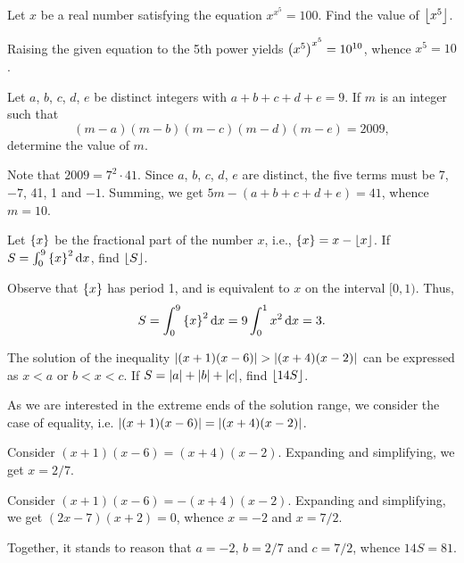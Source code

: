 \begin{question}[10]\label{A::2024-O-1-11}
    Let $x$ be a real number satisfying the equation $x^{x^5} = 100$. Find the value of $\left\lfloor x^5 \right\rfloor$.
\end{question}
\begin{solution*}
    Raising the given equation to the 5th power yields $\left( x^5 \right)^{x^5} = 10^{10}$, whence $x^5 = 10$.
\end{solution*}

\begin{question}[10]\label{A::2024-O-1-12}
    Let $a$, $b$, $c$, $d$, $e$ be distinct integers with $a + b + c + d + e = 9$. If $m$ is an integer such that \[(m-a)(m-b)(m-c)(m-d)(m-e) = 2009,\] determine the value of $m$.
\end{question}
\begin{solution*}
    Note that $2009 = 7^2 \cdot 41$. Since $a$, $b$, $c$, $d$, $e$ are distinct, the five terms must be 7, $-7$, 41, 1 and $-1$. Summing, we get $5m - (a + b + c + d + e) = 41$, whence $m = 10$.
\end{solution*}

\begin{question}[3]\label{A::2024-O-1-13}
    Let $\left\lbrace x \right\rbrace$ be the fractional part of the number $x$, i.e., $\left\lbrace x \right\rbrace = x - \left\lfloor x \right\rfloor$. If $S = \int_0^9 \left\lbrace x \right\rbrace^2 \mathop{\mathrm{d}x}$, find $\left\lfloor S \right\rfloor$.
\end{question}
\begin{solution*}
    Observe that $\left\lbrace x \right\rbrace$ has period 1, and is equivalent to $x$ on the interval $[0, 1)$. Thus, \[S = \int_0^9 \left\lbrace x \right\rbrace^2 \mathop{\mathrm{d}x} = 9 \int_0^1 x^2 \mathop{\mathrm{d}x} = 3.\]
\end{solution*}

\begin{question}[81]\label{A::2024-O-1-14}
    The solution of the inequality $\left\lvert (x+1)(x-6) \right\rvert > \left\lvert (x+4)(x-2) \right\rvert$ can be expressed as $x < a$ or $b < x < c$. If $S = \left\lvert a \right\rvert + \left\lvert b \right\rvert + \left\lvert c \right\rvert$, find $\left\lfloor 14S \right\rfloor$.
\end{question}
\begin{solution*}
    As we are interested in the extreme ends of the solution range, we consider the case of equality, i.e. $\left\lvert (x+1)(x-6) \right\rvert = \left\lvert (x+4)(x-2) \right\rvert$.

     Consider $(x+1)(x-6) = (x+4)(x-2)$. Expanding and simplifying, we get $x = 2/7$.

     Consider $(x+1)(x-6) = -(x+4)(x-2)$. Expanding and simplifying, we get $(2x-7)(x+2) = 0$, whence $x = -2$ and $x = 7/2$.

    Together, it stands to reason that $a = -2$, $b = 2/7$ and $c = 7/2$, whence $14S = 81$.
\end{solution*}


